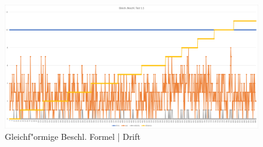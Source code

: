     \begin{figure} [h]
        \centering
        \includegraphics[width = 15cm]{Bilder/_constDistance001}
        \caption{Gleichf"ormige Beschl. Formel | Drift}
        \end{figure}
    
